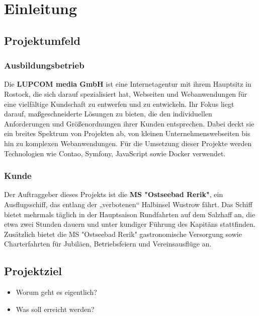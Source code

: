 \section{Einleitung}
\label{sec:Einleitung}


\subsection{Projektumfeld} 
\label{sec:Projektumfeld}

\subsubsection{Ausbildungsbetrieb}

Die \textbf{LUPCOM media GmbH} ist eine Internetagentur mit ihrem Hauptsitz in Rostock, die sich darauf spezialisiert hat, Webseiten und Webanwendungen für eine vielfältige Kundschaft zu entwerfen und zu entwickeln. Ihr Fokus liegt darauf, maßgeschneiderte Lösungen zu bieten, die den individuellen Anforderungen und Größenordnungen ihrer Kunden entsprechen. Dabei deckt sie ein breites Spektrum von Projekten ab, von kleinen Unternehmenswebseiten bis hin zu komplexen Webanwendungen. Für die Umsetzung dieser Projekte werden Technologien wie Contao, Symfony, JavaScript sowie Docker verwendet.

\subsubsection{Kunde}

Der Auftraggeber dieses Projekts ist die \textbf{MS "Ostseebad Rerik"}, ein Ausflugsschiff, das entlang der „verbotenen“ Halbinsel Wustrow fährt. Das Schiff bietet mehrmals täglich in der Hauptsaison Rundfahrten auf dem Salzhaff an, die etwa zwei Stunden dauern und unter kundiger Führung des Kapitäns stattfinden. Zusätzlich bietet die MS "Ostseebad Rerik" gastronomische Versorgung sowie Charterfahrten für Jubiläen, Betriebsfeiern und Vereinsausflüge an.


\subsection{Projektziel} 
\label{sec:Projektziel}
\begin{itemize}
	\item Worum geht es eigentlich?
	\item Was soll erreicht werden?
\end{itemize}


